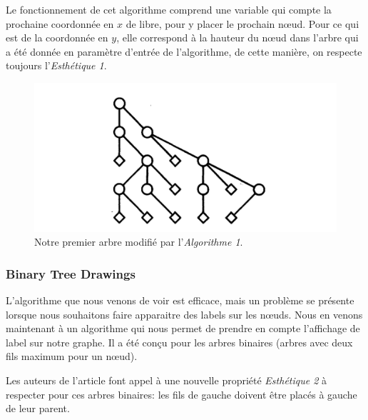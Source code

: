 \documentclass{article}
\begin{document}
    Le fonctionnement de cet algorithme comprend une variable qui compte la prochaine coordonnée en $x$ de libre, pour y placer le prochain n\oe{}ud. Pour ce qui est de la coordonnée en $y$, elle correspond à la hauteur du n\oe{}ud dans l'arbre qui a été donnée en paramètre d'entrée de l'algorithme, de cette manière, on respecte toujours l'\emph{Esthétique 1}.

    \vfill
    \begin{figure}[h]
    		\begin{center}
    			\includegraphics[scale=0.4]{arbreNaif.png}
    		\end{center}
    	\caption{Notre premier arbre modifié par l'\emph{Algorithme 1}. \cite{article79}}
      \label{fig:arbreNaif}
    \end{figure}
    \vfill

    \subsubsection{Binary Tree Drawings}

    L'algorithme que nous venons de voir est efficace, mais un problème se présente lorsque nous souhaitons faire apparaitre des labels sur les n\oe{}uds. Nous en venons maintenant à un algorithme qui nous permet de prendre en compte l'affichage de label sur notre graphe. Il a été conçu pour les arbres binaires (arbres avec deux fils maximum pour un n\oe{}ud).

    Les auteurs de l'article \cite{article79} font appel à une nouvelle propriété \emph{Esthétique 2} à respecter pour ces arbres binaires: les fils de gauche doivent être placés à gauche de leur parent.
\end{document}
